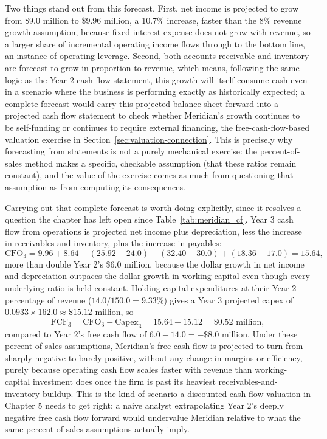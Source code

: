 \documentclass[../ai_in_finance]{subfiles}
\begin{document}
Two things stand out from this forecast. First, net income is projected to grow from \$9.0 million to \$9.96 million, a 10.7\% increase, faster than the 8\% revenue growth assumption, because fixed interest expense does not grow with revenue, so a larger share of incremental operating income flows through to the bottom line, an instance of operating leverage.
Second, both accounts receivable and inventory are forecast to grow in proportion to revenue, which means, following the same logic as the Year 2 cash flow statement, this growth will itself consume cash even in a scenario where the business is performing exactly as historically expected; a complete forecast would carry this projected balance sheet forward into a projected cash flow statement to check whether Meridian's growth continues to be self-funding or continues to require external financing, the free-cash-flow-based valuation exercise in Section~\ref{sec:valuation-connection}.
This is precisely why forecasting from statements is not a purely mechanical exercise: the percent-of-sales method makes a specific, checkable assumption (that these ratios remain constant), and the value of the exercise comes as much from questioning that assumption as from computing its consequences.

Carrying out that complete forecast is worth doing explicitly, since it resolves a question the chapter has left open since Table~\ref{tab:meridian_cf}. Year 3 cash flow from operations is projected net income plus depreciation, less the increase in receivables and inventory, plus the increase in payables:
\begin{equation*}
\text{CFO}_3 = 9.96 + 8.64 - (25.92 - 24.0) - (32.40 - 30.0) + (18.36 - 17.0) = 15.64,
\end{equation*}
more than double Year 2's \$6.0 million, because the dollar growth in net income and depreciation outpaces the dollar growth in working capital even though every underlying ratio is held constant. Holding capital expenditures at their Year 2 percentage of revenue ($14.0/150.0 = 9.33\%$) gives a Year 3 projected capex of $0.0933 \times 162.0 \approx \$15.12$ million, so
\begin{equation*}
\text{FCF}_3 = \text{CFO}_3 - \text{Capex}_3 = 15.64 - 15.12 = \$0.52 \text{ million},
\end{equation*}
compared to Year 2's free cash flow of $6.0 - 14.0 = -\$8.0$ million. Under these percent-of-sales assumptions, Meridian's free cash flow is projected to turn from sharply negative to barely positive, without any change in margins or efficiency, purely because operating cash flow scales faster with revenue than working-capital investment does once the firm is past its heaviest receivables-and-inventory buildup. This is the kind of scenario a discounted-cash-flow valuation in Chapter 5 needs to get right: a naive analyst extrapolating Year 2's deeply negative free cash flow forward would undervalue Meridian relative to what the same percent-of-sales assumptions actually imply.
\end{document}
